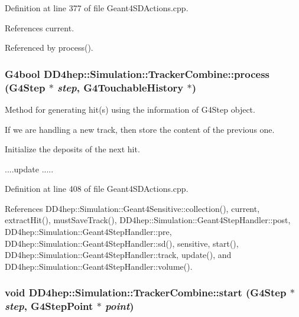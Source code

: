 Definition at line 377 of file Geant4SDActions.cpp.

References current.

Referenced by process().\hypertarget{struct_d_d4hep_1_1_simulation_1_1_tracker_combine_a8d3a583a2f70cb49bcc3d6eda5363a85}{
\subsubsection[{process}]{\setlength{\rightskip}{0pt plus 5cm}G4bool DD4hep::Simulation::TrackerCombine::process (G4Step $\ast$ {\em step}, \/  G4TouchableHistory $\ast$)}}
\label{struct_d_d4hep_1_1_simulation_1_1_tracker_combine_a8d3a583a2f70cb49bcc3d6eda5363a85}


Method for generating hit(s) using the information of G4Step object. 

If we are handling a new track, then store the content of the previous one.

Initialize the deposits of the next hit.

....update ..... 

Definition at line 408 of file Geant4SDActions.cpp.

References DD4hep::Simulation::Geant4Sensitive::collection(), current, extractHit(), mustSaveTrack(), DD4hep::Simulation::Geant4StepHandler::post, DD4hep::Simulation::Geant4StepHandler::pre, DD4hep::Simulation::Geant4StepHandler::sd(), sensitive, start(), DD4hep::Simulation::Geant4StepHandler::track, update(), and DD4hep::Simulation::Geant4StepHandler::volume().\hypertarget{struct_d_d4hep_1_1_simulation_1_1_tracker_combine_a104188fb9a41662e03eacc2d34e4bced}{
\subsubsection[{start}]{\setlength{\rightskip}{0pt plus 5cm}void DD4hep::Simulation::TrackerCombine::start (G4Step $\ast$ {\em step}, \/  G4StepPoint $\ast$ {\em point})}}
\label{struct_d_d4hep_1_1_simulation_1_1_tracker_combine_a104188fb9a41662e03eacc2d34e4bced}


